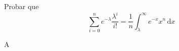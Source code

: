 	\question%
		Probar que
		\begin{equation*}
			\sum_{i=0}^{n}e^{-\lambda}\frac{\lambda^{i}}{i!}=\frac{1}{n}\int_{\lambda}^{\infty}e^{-x}x^{n}\,\mathrm{d}x
		\end{equation*}
	
	\begin{solutionorbox}
		A
	\end{solutionorbox}
